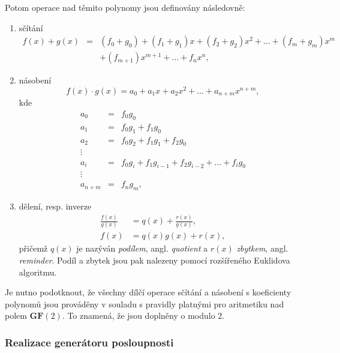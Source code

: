 Potom operace nad těmito polynomy jsou definovány následovně:
\begin{enumerate}[I]
\item sčítání
\begin{eqnarray}
 f(x) + g(x) &=& (f_0+g_0) +  (f_1+g_1) x +  (f_2+g_2) x^2 + \ldots +  (f_m+g_m) x^m  \nonumber \\ 
 && + (f_{m+1}) x^{m+1} + \ldots + f_n x^n, \label{eq_poly_add}
\end{eqnarray}

\item násobení
\begin{equation}
 f(x) \cdot g(x) = a_0 +  a_1 x + a_2 x^2 + \ldots +  a_{n+m} x^{n+m}, \label{eq_poly_multipl}
\end{equation}
kde 
\begin{eqnarray}
 a_0 &=& f_0 g_0  \nonumber \\ 
 a_1 &=& f_0 g_1 +  f_1 g_0 \nonumber \\ 
 a_2 &=& f_0 g_2 +  f_1 g_1 +  f_2 g_0 \nonumber \\ 
 \vdots \nonumber \\ 
 a_i &=& f_0 g_i +  f_1 g_{i-1} + f_2 g_{i-2} + \ldots + f_i g_0 \nonumber \\ 
 \vdots \nonumber \\ 
 a_{n+m} &=& f_n g_m, \nonumber
\end{eqnarray}

\item dělení, resp. inverze
\begin{eqnarray}
 \frac{f(x)}{g(x)} &= q(x) +  \frac{r(x)}{g(x)}, \nonumber \\
 f(x) &= q(x)g(x) + r(x), \label{eq_poly_div}
\end{eqnarray}
přičemž $q(x)$ je nazýván \textsl{podílem}, angl. \textsl{quotient} a $r(x)$ \textsl{zbytkem}, angl. \textsl{reminder}. Podíl a zbytek jsou pak nalezeny pomocí rozšířeného Euklidova algoritmu.

\end{enumerate}

Je nutno podotknout, že všechny dílčí operace sčítání a násobení s koeficienty  polynomů jsou prováděny v souladu s pravidly platnými pro aritmetiku nad polem $\mathbf{GF}(2)$. To znamená, že jsou doplněny o modulo 2.





 \subsubsection{Realizace generátoru posloupnosti}




